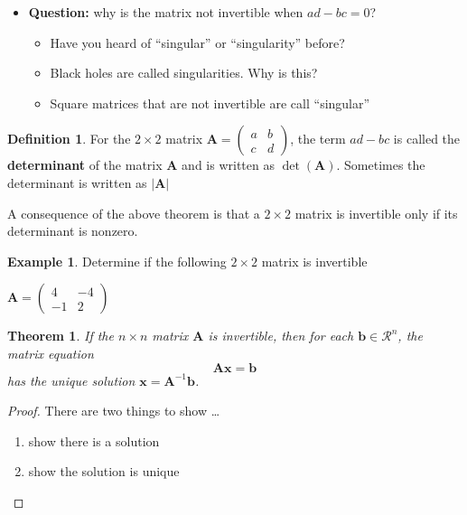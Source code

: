 \documentclass[
]{book}
\providecommand{\tightlist}{%
  \setlength{\itemsep}{0pt}\setlength{\parskip}{0pt}}
\newtheorem{theorem}{Theorem}[chapter]
\theoremstyle{definition}
\newtheorem{definition}{Definition}[chapter]
\theoremstyle{definition}
\newtheorem{example}{Example}[chapter]
\theoremstyle{definition}
\theoremstyle{definition}
\theoremstyle{remark}
\begin{document}
\begin{itemize}
\tightlist
\item
  \textbf{Question:} why is the matrix not invertible when \(ad - bc = 0\)?

  \begin{itemize}
  \tightlist
  \item
    Have you heard of ``singular'' or ``singularity'' before?
  \item
    Black holes are called singularities. Why is this?
  \item
    Square matrices that are not invertible are call ``singular''
  \end{itemize}
\end{itemize}

\begin{definition}
For the \(2 \times 2\) matrix \(\mathbf{A} = \begin{pmatrix} a & b \\ c & d \end{pmatrix}\), the term \(ad - bc\) is called the \textbf{determinant} of the matrix \(\mathbf{A}\) and is written as \(\operatorname{det}(\mathbf{A})\). Sometimes the determinant is written as \(| \mathbf{A}|\)
\end{definition}

A consequence of the above theorem is that a \(2 \times 2\) matrix is invertible only if its determinant is nonzero.

\begin{example}
Determine if the following \(2 \times 2\) matrix is invertible

\(\mathbf{A} = \begin{pmatrix} 4 & -4 \\ -1 & 2 \end{pmatrix}\)
\end{example}

\begin{theorem}
If the \(n \times n\) matrix \(\mathbf{A}\) is invertible, then for each \(\mathbf{b} \in \mathcal{R}^n\), the matrix equation
\[
\mathbf{A} \mathbf{x} = \mathbf{b}
\]
has the unique solution \(\mathbf{x} = \mathbf{A}^{-1} \mathbf{b}\).
\end{theorem}

\begin{proof}

There are two things to show \ldots{}

\begin{enumerate}
\def\labelenumi{\arabic{enumi})}
\item
  show there is a solution
\item
  show the solution is unique
\end{enumerate}

\end{proof}
\end{document}
